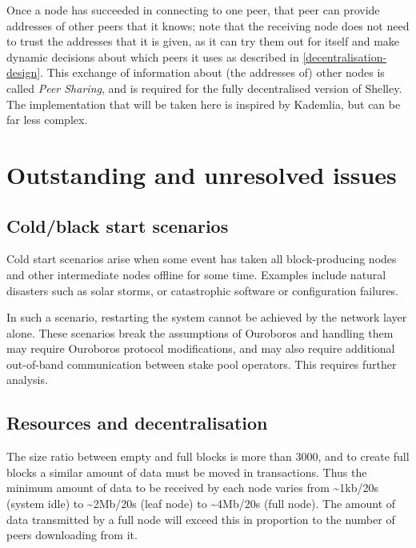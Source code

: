 \documentclass[11pt,a4paper]{article}
\begin{document}
Once a node has succeeded in connecting to one peer, that peer can
provide addresses of other peers that it knows; note that the receiving
node does not need to trust the addresses that it is given, as it can
try them out for itself and make dynamic decisions about which peers it
uses as described in \cref{decentralisation-design}. This exchange of
information about (the addresses of) other nodes is called \emph{Peer Sharing},
and is required for the fully decentralised version of Shelley. The
implementation that will be taken here is inspired by Kademlia, but can
be far less complex.

\section{Outstanding and unresolved issues}
\label{outstanding-unresolved-issues}

\subsection{Cold/black start scenarios}
\label{coldblack-start-scenarios}

Cold start scenarios arise when some event has taken all block-producing
nodes and other intermediate nodes offline for some time. Examples
include natural disasters such as solar storms, or catastrophic software
or configuration failures.

In such a scenario, restarting the system cannot be achieved by the
network layer alone. These scenarios break the assumptions of Ouroboros
and handling them may require Ouroboros protocol modifications, and may
also require additional out-of-band communication between stake pool
operators. This requires further analysis.

\subsection{Resources and decentralisation}
\label{resources-and-decentralisation}

The size ratio between empty and full blocks is more than 3000, and to
create full blocks a similar amount of data must be moved in
transactions. Thus the minimum amount of data to be received by each
node varies from \textasciitilde{}1kb/20s (system idle) to
\textasciitilde{}2Mb/20s (leaf node) to \textasciitilde{}4Mb/20s (full
node). The amount of data transmitted by a full node will exceed this in
proportion to the number of peers downloading from it.
\end{document}
